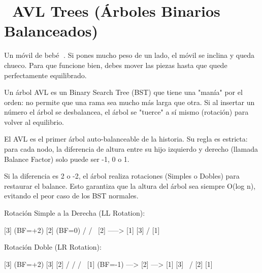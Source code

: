 ﻿\chapter[\emj{⚖️}~AVL Trees (Árboles Binarios Balanceados)]{~AVL Trees (Árboles Binarios Balanceados)}

\begin{dsaquees}

Un móvil de bebé 👶. Si pones mucho peso de un lado, el móvil se
inclina y queda chueco. Para que funcione bien, debes mover las piezas
hasta que quede perfectamente equilibrado.

Un árbol AVL es un Binary Search Tree (BST) que tiene una "manía"
por el orden: no permite que una rama sea mucho más larga que otra. 
Si al insertar un número el árbol se desbalancea, el árbol se 
"tuerce" a sí mismo (rotación) para volver al equilibrio.

\end{dsaquees}

\begin{dsaotraforma}

El AVL es el primer árbol auto-balanceable de la historia. Su regla
es estricta: para cada nodo, la diferencia de altura entre su hijo
izquierdo y derecho (llamada Balance Factor) solo puede ser -1, 0 o 1.

Si la diferencia es 2 o -2, el árbol realiza rotaciones (Simples o 
Dobles) para restaurar el balance. Esto garantiza que la altura del
árbol sea siempre O(log n), evitando el peor caso de los BST normales.

\end{dsaotraforma}

\begin{dsadiagrama}
Rotación Simple a la Derecha (LL Rotation):

      [3] (BF=+2)              [2] (BF=0)
     /                        /   \
   [2]          ----->      [1]    [3]
  /
[1]

Rotación Doble (LR Rotation):

    [3] (BF=+2)         [3]                 [2]
   /                   /                   /   \
 [1] (BF=-1)  --->   [2]      --->       [1]    [3]
   \                /
   [2]            [1]
\end{dsadiagrama}

